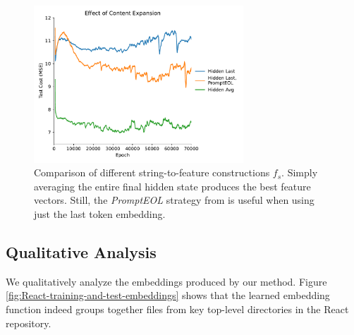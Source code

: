 \documentclass{article}
\begin{document}
\begin{figure}[ht]
  \centering
  \includegraphics[width=0.7\textwidth]{figures/content_expansion.pdf}
  \caption{Comparison of different string-to-feature constructions $f_s$. Simply averaging the entire final hidden state produces the best feature vectors. Still, the \emph{PromptEOL} strategy from \cite{jiang2023scalingsentenceembeddingslarge} is useful when using just the last token embedding.}
  \label{fig:content-expansion}
\end{figure}

\subsection{Qualitative Analysis}

We qualitatively analyze the embeddings produced by our method. Figure \ref{fig:React-training-and-test-embeddings} shows that the learned embedding function indeed groups together files from key top-level directories in the React repository.
\end{document}
